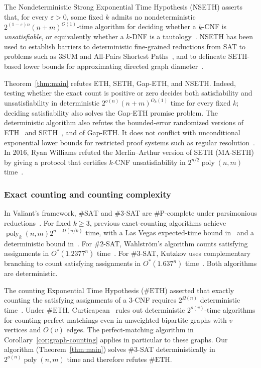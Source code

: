 \documentclass[11pt,reqno]{amsart}
\numberwithin{equation}{section}
\theoremstyle{definition}\newtheorem{definition}[theorem]{Definition}
\theoremstyle{remark}\newtheorem{remark}[theorem]{Remark}
\newcommand{\poly}{\operatorname{poly}}
\renewcommand{\ge}{\geqslant}
\begin{document}
The Nondeterministic Strong Exponential Time Hypothesis (NSETH)
asserts that, for every $\varepsilon>0$, some fixed $k$ admits no
nondeterministic $2^{(1-\varepsilon)n}(n+m)^{O(1)}$-time algorithm
for deciding whether a $k$-CNF is \emph{unsatisfiable}, or equivalently
whether a $k$-DNF is a tautology~\cite{CGIMPS16}.
NSETH has been used to establish barriers to deterministic fine-grained
reductions from SAT to problems such as 3SUM and All-Pairs Shortest
Paths~\cite{CGIMPS16}, and to delineate SETH-based lower bounds for
approximating directed graph diameter~\cite{Li21}.

Theorem~\ref{thm:main} refutes ETH, SETH, Gap-ETH, and NSETH.
Indeed, testing whether the exact count is positive or zero decides
both satisfiability and unsatisfiability in deterministic
$2^{o(n)}(n+m)^{O_k(1)}$ time for every fixed $k$; deciding
satisfiability also solves the Gap-ETH promise problem.
The deterministic algorithm also refutes the bounded-error randomized
versions of ETH~\cite[Section~1]{DHMTW} and SETH~\cite[Definition~2.1]{CDL16}, and of Gap-ETH.
It does not conflict with unconditional exponential lower bounds for
restricted proof systems such as regular resolution~\cite{BeckImp13}.
In 2016, Ryan Williams refuted the Merlin--Arthur version of SETH
(MA-SETH) by giving a protocol that certifies $k$-CNF unsatisfiability
in $2^{n/2}\poly(n,m)$ time~\cite[Theorem~3.3]{Wil16}.

\subsubsection{Exact counting and counting complexity}\label{subsec:related-counting}
In Valiant's framework, $\#\mathrm{SAT}$ and $\#3$-SAT are
$\#\mathrm P$-complete under parsimonious
reductions~\cite[Section~3, Facts~1--2]{Val79}.
For fixed $k\ge3$, previous exact-counting algorithms achieve
$\poly_k(n,m)2^{n-\Omega(n/k)}$ time, with a Las Vegas
expected-time bound in~\cite[Lemma~3.5]{IMP12} and a deterministic
bound in~\cite[Theorem~1.6]{CW21}.
For $\#2$-SAT, Wahlstr\"om's algorithm counts satisfying assignments
in $O^*(1.2377^n)$ time~\cite{Wahlstrom08}. For $\#3$-SAT, Kutzkov
uses complementary branching to count satisfying assignments in
$O^*(1.637^n)$ time~\cite{Kutzkov26}. Both algorithms are deterministic.

The counting Exponential Time Hypothesis ($\#\mathrm{ETH}$)
asserted that exactly counting the satisfying assignments of a $3$-CNF
requires $2^{\Omega(n)}$ deterministic time~\cite[Section~1]{DHMTW}.
Under $\#\mathrm{ETH}$, Curticapean~\cite{Cur18} rules out deterministic
$2^{o(v)}$-time algorithms for counting perfect matchings even in
unweighted bipartite graphs with $v$ vertices and $O(v)$ edges.
The perfect-matching algorithm in Corollary~\ref{cor:graph-counting}
applies in particular to these graphs.
Our algorithm (Theorem~\ref{thm:main}) solves $\#3$-SAT deterministically
in $2^{o(n)}\poly(n,m)$ time and therefore refutes $\#\mathrm{ETH}$.
\end{document}
